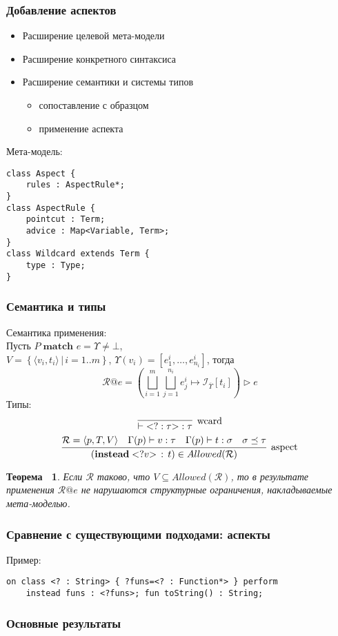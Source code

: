 \documentclass{beamer}
\newtheorem{Th}{Теорема~}
\newcommand{\Inst}[2]{\mathcal{I}_{#1} \left[ #2 \right]}%
\newcommand{\match}[3][]{#2 \; \mathbf{match}_{#1} \; #3}
\newcommand{\ang}[1]{\mathsf{<}#1\mathsf{>}}
\newcommand{\wcard}[2]{\mathsf{<} #1 : #2 \mathsf{>} }
\newcommand{\ME}{\Upsilon}
\newcommand{\meflatten}[1]{\overline{#1}}
\newcommand{\myinfer}[3][]{\infer[\mbox{#1}]{#2}{#3}}
\newcommand{\subst}[2]{ #1 \mapsto #2 }
\newcommand{\apply}[2]{\left( #1 \right) \triangleright #2}
\begin{document}
\begin{frame}[fragile]
	\frametitle{Добавление аспектов}
\begin{itemize}
\item Расширение целевой мета-модели
\item Расширение конкретного синтаксиса
\item Расширение семантики и системы типов
	\begin{itemize}
		\item сопоставление с образцом
		\item применение аспекта
	\end{itemize}
\end{itemize}	

Мета-модель:
\begin{lstlisting}
class Aspect {
    rules : AspectRule*;
}
class AspectRule {
    pointcut : Term;
    advice : Map<Variable, Term>;
}
class Wildcard extends Term {
    type : Type;
}
\end{lstlisting}
\end{frame}

\begin{frame}[fragile]
	\frametitle{Семантика и типы}
Семантика применения:	\\
Пусть $\match{P}{e} = \ME \neq \bot$, \\$V = \left\{\langle v_i, t_i \rangle \,|\, i = 1..m \right\}$,  $\ME(v_i) = [e^i_1, \ldots, e^i_{n_i}]$, тогда
	$$\mathcal{R}@e
		= \apply{\bigsqcup\limits_{i=1}^{m} \bigsqcup\limits_{j=1}^{n_i}
			\subst{e^i_j}{\Inst{\meflatten{\ME}}{t_i}}}{e}$$
Типы:
$$
	\myinfer[wcard]{ \vdash \wcard{?}{\tau} : \tau}{}
$$
$$
	\myinfer[aspect]{
		(\mathbf{instead} \; \ang{?v} \, : \, t) \in Allowed(\mathcal{R})
	}{
		\mathcal{R} = \langle p, T, V \rangle &
		\Gamma(p) \vdash v : \tau &
		\Gamma(p) \vdash t : \sigma &
		\sigma \preceq \tau
	}
$$
\begin{Th}
Если $\mathcal{R}$ таково, что $V \subseteq Allowed(\mathcal{R})$, то в результате применения $\mathcal{R}@e$ не нарушаются структурные ограничения, накладываемые мета-моделью.
\end{Th}

\end{frame}

\begin{frame}[fragile]
	\frametitle{Сравнение с существующими подходами: аспекты}
	

Пример:
\begin{lstlisting}[xleftmargin=0.3cm]
on class <? : String> { ?funs=<? : Function*> } perform
    instead funs : <?funs>; fun toString() : String;
\end{lstlisting}

\end{frame}

\begin{frame}[fragile]
	\frametitle{Основные результаты}
	

\end{frame}
\end{document}
